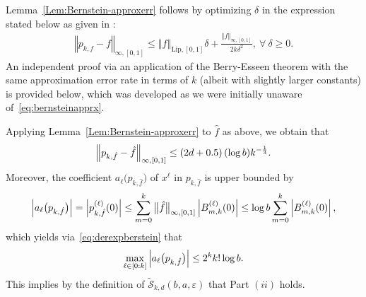 \documentclass[a4paper,onecolumn,11pt,accepted=2026-05-12]{quantumarticle}
\newcommand{\norm}[1]{\left\Vert#1\right\Vert}
\newcommand{\abs}[1]{\left\vert#1\right\vert}
\newcommand{\cS}{\mathcal{S}}
\begin{document}
Lemma~\ref{Lem:Bernstein-approxerr}  follows by optimizing $\delta$ in the expression stated below as given in \cite[Page 111]{Davis-1975}:
\begin{align}
\norm{p_{k,f}-f}_{\infty,[0,1]} \leq \norm{f}_{\mathrm{Lip},[0,1]} \delta+ \frac{\norm{f}_{\infty,[0,1]}}{2k\delta^2}, ~\forall~ \delta \geq 0. \label{eq:bernsteinapprx}
\end{align}
An independent proof via an application of the Berry-Esseen theorem with the same approximation error rate in terms of $k$ (albeit with slightly larger constants) is provided below, which was developed as we were initially unaware of~\eqref{eq:bernsteinapprx}.


\medskip


Applying Lemma~\ref{Lem:Bernstein-approxerr} to $\hat f$ as above, we obtain that 
\begin{align}
    \norm{p_{k,\hat f}-\hat f}_{\infty,[0,1]} \leq \left(2d+0.5\right) (\log  b)  k^{-\frac 13}. \notag 
\end{align}
Moreover, the coefficient $a_{\ell}\big(p_{k,\hat f}\big)$ of $x^{\ell}$ in $p_{k,\hat f}$ is upper bounded by
\begin{align}
  \abs{a_{\ell}\big(p_{k,\hat f}\big)} =  \abs{p^{(\ell)}_{k,\hat f}(0)} \leq  \sum_{m=0}^k \big\|\hat f\big\|_{\infty,[0,1]} \abs{  B_{m,k}^{(\ell)}(0)} \leq \log  b  \sum_{m=0}^k \abs{  B_{m,k}^{(\ell)}(0)}, \notag 
\end{align}
which yields via~\eqref{eq:derexpberstein} that
\begin{align}
  \max_{\ell \in [0: k]}  \abs{a_{\ell}\big(p_{k,\hat f}\big)} \leq  2^k k! \log  b . \notag 
\end{align}
This implies by the definition of $\tilde{\cS}_{k,d}(b,a,\varepsilon)$ that Part $(ii)$ holds.
\end{document}
